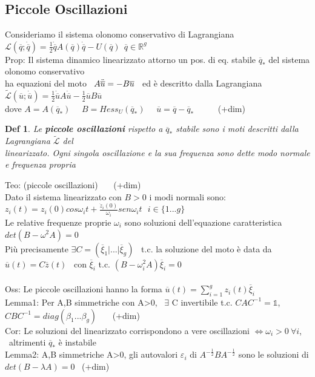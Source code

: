 \documentclass{article}
\theoremstyle{unnumbered}
\newtheorem* {theoremT}{Def}
\theoremstyle{unnumbered1}
\newenvironment{defi}{\begin{gBox}\begin{theoremT}}{\end{theoremT}\end{gBox}}
\begin{document}
\subsection{Piccole Oscillazioni}
%
Consideriamo il sistema olonomo conservativo di Lagrangiana \ \ $\mathcal{L}(\overline{q};\dot{\overline{q}})=\frac{1}{2}\dot{\overline{q}}A(\overline{q})\Dot{\overline{q}} -U(\overline{q}) \ \ \overline{q}\in\mathbb{R}^g$\\
Prop: Il sistema dinamico linearizzato attorno  un pos.\! di eq.\! stabile $\overline{q}_*$ del sistema olonomo conservativo\\
\phantom{Prop: }ha equazioni del moto \ $A\Ddot{\overline{u}}= -B\overline{u}$ \ ed è descritto dalla Lagrangiana \ $\widetilde{\mathcal{L}}(\overline{u};\dot{\overline{u}})=\frac{1}{2}\Dot{\overline{u}}A\Dot{\overline{u}} -\frac{1}{2}\overline{u}B\overline{u}$ \\
\phantom{Prop: }dove $A=A(\overline{q}_*)$ \ \ $B= Hess_U(\overline{q}_*)$ \ \ $\overline{u}=\overline{q}-\overline{q}_*$ \ \ \ \ \ (+dim) \newpage  %
%
%
%
\begin{defi}
Le \textbf{piccole oscillazioni} rispetto a $\overline{q}_*$ stabile sono i moti descritti dalla Lagrangiana $\widetilde{\mathcal{L}}$ del\\ linearizzato.
Ogni singola oscillazione e la sua frequenza sono dette modo normale e frequenza propria
\end{defi}
%
%
%
Teo: (piccole oscillazioni) \ \ \ (+dim)\\
Dato il sistema linearizzato con $B>0$ i modi normali sono: \ \ $z_i(t)=z_i(0)cos\omega_it+\frac{\dot{z}_i(0)
}{\omega_i}sen\omega_it \ \ \ i\in\{1...g\}$ \\
Le relative frequenze proprie $\omega_i$ sono soluzioni dell'equazione caratteristica \ $det(B-\omega^2A)=0$ \\
Più precisamente $\exists C=(\overline{\xi}_1|...|\overline{\xi}_g)$ \ t.c. la soluzione del moto è data da $\overline{u}(t)=C\overline{z}(t)$ \ con $\overline{\xi}_i$ t.c. $(B-\omega_i^2A)\overline{\xi}_i=0$\\ \\
%
%
%
Oss: Le piccole oscillazioni hanno la forma $\overline{u}(t)=\sum_{i=1}^gz_i(t)\overline{\xi}_i$\\
Lemma1: Per A,B simmetriche con A>0, \ $\exists$ C invertibile t.c. $CAC^{-1}= \mathds{1} $, \ $CBC^{-1}=diag(\beta_1...\beta_g)$ \ \ \ (+dim)\\
Cor: Le soluzioni del linearizzato corrispondono a vere oscillazioni $\Longleftrightarrow\omega_i>0 \ \forall i$, \ altrimenti $\overline{q}_*$ è instabile\\
Lemma2: A,B simmetriche A>0, gli autovalori $\varepsilon_i$ di $A^{-\frac{1}{2}}BA^{-\frac{1}{2}}$ sono le soluzioni di $det(B-\lambda A)=0$ \ (+dim)\\ 
\end{document}
